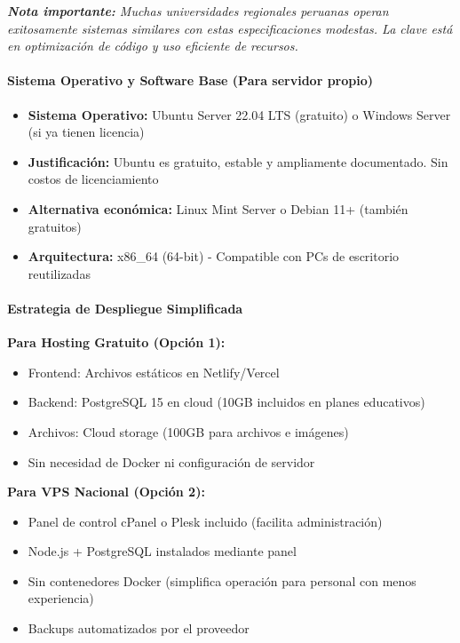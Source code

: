 \documentclass[12pt,a4paper]{article}
\begin{document}
\textit{\textbf{Nota importante:} Muchas universidades regionales peruanas operan exitosamente sistemas similares con estas especificaciones modestas. La clave está en optimización de código y uso eficiente de recursos.}

\paragraph{Sistema Operativo y Software Base (Para servidor propio)}

\begin{itemize}[noitemsep]
    \item \textbf{Sistema Operativo:} Ubuntu Server 22.04 LTS (gratuito) o Windows Server (si ya tienen licencia)
    \item \textbf{Justificación:} Ubuntu es gratuito, estable y ampliamente documentado. Sin costos de licenciamiento
    \item \textbf{Alternativa económica:} Linux Mint Server o Debian 11+ (también gratuitos)
    \item \textbf{Arquitectura:} x86\_64 (64-bit) - Compatible con PCs de escritorio reutilizadas
\end{itemize}

\paragraph{Estrategia de Despliegue Simplificada}

\textbf{Para Hosting Gratuito (Opción 1):}
\begin{itemize}[noitemsep]
    \item Frontend: Archivos estáticos en Netlify/Vercel
    \item Backend: PostgreSQL 15 en cloud (10GB incluidos en planes educativos)
    \item Archivos: Cloud storage (100GB para archivos e imágenes)
    \item Sin necesidad de Docker ni configuración de servidor
\end{itemize}

\textbf{Para VPS Nacional (Opción 2):}
\begin{itemize}[noitemsep]
    \item Panel de control cPanel o Plesk incluido (facilita administración)
    \item Node.js + PostgreSQL instalados mediante panel
    \item Sin contenedores Docker (simplifica operación para personal con menos experiencia)
    \item Backups automatizados por el proveedor
\end{itemize}
\end{document}
